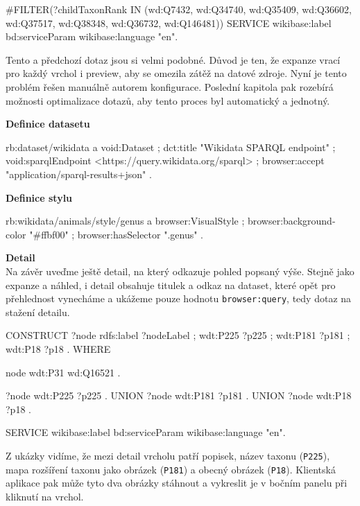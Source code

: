 \begin{prikl}
\begin{code}
{    #FILTER(?childTaxonRank IN (wd:Q7432, wd:Q34740, wd:Q35409,
    wd:Q36602, wd:Q37517, wd:Q38348, wd:Q36732, wd:Q146481))
    SERVICE wikibase:label { bd:serviceParam wikibase:language "en". }
}
\end{code}
Tento a předchozí dotaz jsou si velmi podobné. Důvod je ten, že expanze vrací pro každý vrchol i preview, aby se omezila zátěž na datové zdroje. Nyní je tento problém řešen manuálně autorem konfigurace. Poslední kapitola pak rozebírá možnosti optimalizace dotazů, aby tento proces byl automatický a jednotný.
\medskip

\textbf{Definice datasetu}
\begin{code}
rb:dataset/wikidata a void:Dataset ;
    dct:title "Wikidata SPARQL endpoint" ;
    void:sparqlEndpoint <https://query.wikidata.org/sparql> ;
    browser:accept "application/sparql-results+json" .
\end{code}

\textbf{Definice stylu}
\begin{code}
rb:wikidata/animals/style/genus a browser:VisualStyle ;
    browser:background-color "#ffbf00" ;
    browser:hasSelector ".genus" .
\end{code}

\newpage

\textbf{Detail} \\
Na závěr uveďme ještě detail, na který odkazuje pohled popsaný výše. Stejně jako expanze a náhled, i detail obsahuje titulek a odkaz na dataset, které opět pro přehlednost vynecháme a ukážeme pouze hodnotu \texttt{browser:query}, tedy dotaz na stažení detailu.
\begin{code}
CONSTRUCT {
    ?node rdfs:label ?nodeLabel ;
          wdt:P225 ?p225 ;
          wdt:P181 ?p181 ;
          wdt:P18 ?p18 .
} WHERE {
    node wdt:P31 wd:Q16521 .

    {
        ?node wdt:P225 ?p225 .
    } UNION {
        ?node wdt:P181 ?p181 .
    } UNION {
        ?node wdt:P18 ?p18 .
    }

    SERVICE wikibase:label { bd:serviceParam wikibase:language "en". }
}
\end{code}

Z ukázky vidíme, že mezi detail vrcholu patří popisek, název taxonu (\texttt{P225}), mapa rozšíření taxonu jako obrázek (\texttt{P181}) a obecný obrázek (\texttt{P18}). Klientská aplikace pak může tyto dva obrázky stáhnout a vykreslit je v bočním panelu při kliknutí na vrchol.
\end{prikl}


